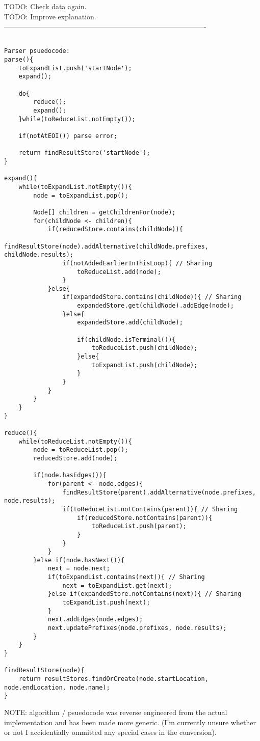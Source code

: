 \documentclass[a4paper,10pt]{article}
\begin{document}
TODO: Check data again.\\
TODO: Improve explanation.\\

-------------------------------------------------------------------------------------

\begin{verbatim}

Parser psuedocode:
parse(){
	toExpandList.push('startNode');
	expand();
	
	do{
		reduce();
		expand();
	}while(toReduceList.notEmpty());
	
	if(notAtEOI()) parse error;
	
	return findResultStore('startNode');
}

expand(){
	while(toExpandList.notEmpty()){
		node = toExpandList.pop();
		
		Node[] children = getChildrenFor(node);
		for(childNode <- children){
			if(reducedStore.contains(childNode)){
				findResultStore(node).addAlternative(childNode.prefixes, childNode.results);
				if(notAddedEarlierInThisLoop){ // Sharing
					toReduceList.add(node);
				}
			}else{
				if(expandedStore.contains(childNode)){ // Sharing
					expandedStore.get(childNode).addEdge(node);
				}else{
					expandedStore.add(childNode);
				
					if(childNode.isTerminal()){
						toReduceList.push(childNode);
					}else{
						toExpandList.push(childNode);
					}
				}
			}
		}
	}
}

reduce(){
	while(toReduceList.notEmpty()){
		node = toReduceList.pop();
		reducedStore.add(node);
		
		if(node.hasEdges()){
			for(parent <- node.edges){
				findResultStore(parent).addAlternative(node.prefixes, node.results);
				if(toReduceList.notContains(parent)){ // Sharing
					if(reducedStore.notContains(parent)){
						toReduceList.push(parent);
					}
				}
			}
		}else if(node.hasNext()){
			next = node.next;
			if(toExpandList.contains(next)){ // Sharing
				next = toExpandList.get(next);
			}else if(expandedStore.notContains(next)){ // Sharing
				toExpandList.push(next);
			}
			next.addEdges(node.edges);
			next.updatePrefixes(node.prefixes, node.results);
		}
	}
}

findResultStore(node){
	return resultStores.findOrCreate(node.startLocation, node.endLocation, node.name);
}

\end{verbatim}

NOTE: algorithm / psuedocode was reverse engineered from the actual implementation and has been made more generic. (I'm currently unsure whether or not I accidentially ommitted any special cases in the conversion).\\
\end{document}
